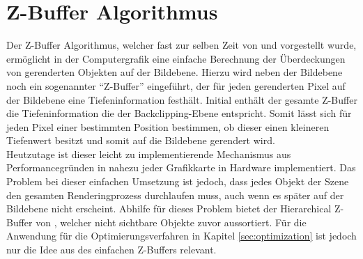 
\section{Z-Buffer Algorithmus} \label{sec:z-buffer}

Der Z-Buffer Algorithmus, welcher fast zur selben Zeit von \citet{straber1974schnelle} und \citet{catmull1974subdivision} vorgestellt wurde, ermöglicht in der Computergrafik eine einfache Berechnung der Überdeckungen von gerenderten Objekten auf der Bildebene. Hierzu wird neben der Bildebene noch ein sogenannter \enquote{Z-Buffer} eingeführt, der für jeden gerenderten Pixel auf der Bildebene eine Tiefeninformation festhält. Initial enthält der gesamte Z-Buffer die Tiefeninformation die der Backclipping-Ebene entspricht. Somit lässt sich für jeden Pixel einer bestimmten Position bestimmen, ob dieser einen kleineren Tiefenwert besitzt und somit auf die Bildebene gerendert wird. \\

Heutzutage ist dieser leicht zu implementierende Mechanismus aus Performancegründen in nahezu jeder Grafikkarte in Hardware implementiert. Das Problem bei dieser einfachen Umsetzung ist jedoch, dass jedes Objekt der Szene den gesamten Renderingprozess durchlaufen muss, auch wenn es später auf der Bildebene nicht erscheint. Abhilfe für dieses Problem bietet der Hierarchical Z-Buffer von \citet{greene1993hierarchical}, welcher nicht sichtbare Objekte zuvor aussortiert. Für die Anwendung für die Optimierungsverfahren in Kapitel \ref{sec:optimization} ist jedoch nur die Idee aus des einfachen Z-Buffers relevant.